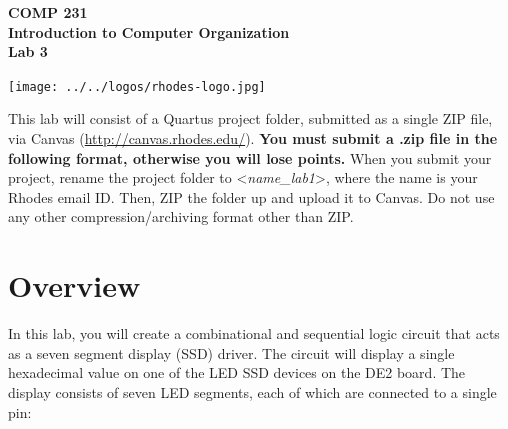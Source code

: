 \documentclass[10pt]{article}
\begin{document}

\hspace{-5mm}
\begin{minipage}{0.65\linewidth}
  \textbf{{\Large COMP 231\\
      Introduction to Computer Organization\\Lab 3}}
\end{minipage}
\begin{minipage}{0.35\linewidth}
  \texttt{[image: ../../logos/rhodes-logo.jpg]}
\end{minipage}

\vspace{.25in}

This lab will consist of a Quartus project folder, submitted as a
single ZIP file, via Canvas (\url{http://canvas.rhodes.edu/}).
{\bf You must submit a .zip file in the following format, otherwise
  you will lose points.} When you submit your project, rename the
project folder to <{\em name\_lab1}>, where the name is your Rhodes
email ID. Then, ZIP the folder up and upload it to Canvas. Do not
use any other compression/archiving format other than ZIP.

\section*{Overview}

In this lab, you will create a combinational and sequential logic
circuit that acts as a seven segment display (SSD) driver. The
circuit will display a single hexadecimal value on one of the LED SSD
devices on the DE2 board. The display consists of seven LED segments,
each of which are connected to a single pin:
\end{document}
